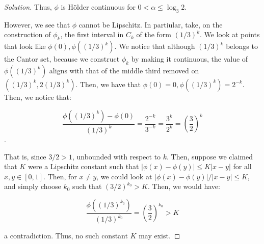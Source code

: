 \documentclass[10pt]{article}
\begin{document}
\begin{proof}[Solution]
Thus, $\phi$ is H\"older continuous for $0 < \alpha \leq \log_3 2$.

However, we see that $\phi$ cannot be Lipschitz. In partiular, take, on the construction of $\phi_k$, the first interval in $C_k$ of the form $(1/3)^k$. We look at points that look like $\phi(0),\phi((1/3)^k)$. We notice that although $(1/3)^k$ belongs to the Cantor set, because we construct $\phi_k$ by making it continuous, the value of $\phi((1/3)^k)$ aligns with that of the middle third removed on $((1/3)^k,2(1/3)^k)$. Then, we have that $\phi(0) = 0, \phi((1/3)^k) = 2^{-k}$. Then, we notice that:

$$ \frac{\phi((1/3)^k) - \phi(0)}{(1/3)^k} = \frac{2^{-k}}{3^{-k}} = \frac{3^k}{2^k} = \left( \frac{3}{2} \right)^k $$.

That is, since $3/2 > 1$, unbounded with respect to $k$. Then, suppose we claimed that $K$ were a Lipschitz constant such that $| \phi(x) - \phi(y) | \leq K |x - y|$ for all $x,y \in [0,1]$. Then, for $x \not = y$, we could look at $| \phi(x) - \phi(y) |/ |x-y| \leq K$, and simply choose $k_0$ such that $(3/2)^{k_0} > K$. Then, we would have:

$$ \frac{\phi((1/3)^{k_0})}{(1/3)^{k_0}} =  \left( \frac{3}{2} \right)^{k_0} > K$$

a contradiction. Thus, no such constant $K$ may exist.

\end{proof}
\end{document}
